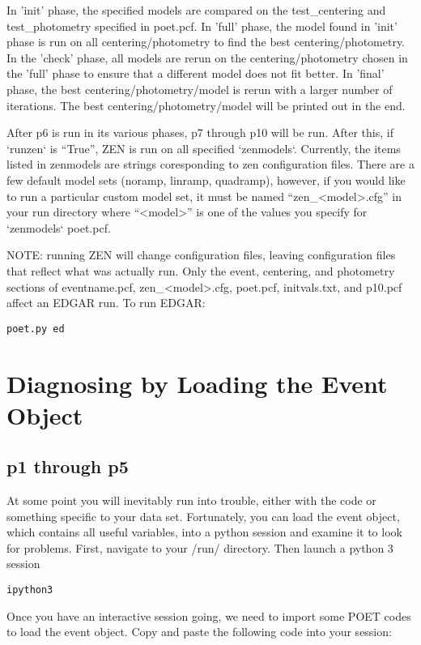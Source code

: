 \documentclass[letterpaper,12pt]{article}
\begin{document}
In 'init' phase, the specified models are compared on the
test\_centering and test\_photometry specified in poet.pcf. In 'full'
phase, the model found in 'init' phase is run on all
centering/photometry to find the best centering/photometry. In the
'check' phase, all models are rerun on the centering/photometry chosen
in the 'full' phase to ensure that a different model does not fit
better. In 'final' phase, the best centering/photometry/model is rerun
with a larger number of iterations. The best
centering/photometry/model will be printed out in the end.

After p6 is run in its various phases, p7 through p10 will be
run. After this, if `runzen` is ``True'', ZEN is run on all specified
`zenmodels`. Currently, the items listed in zenmodels are strings
coresponding to zen configuration files. There are a few default model
sets (noramp, linramp, quadramp), however, if you would like to run a
particular custom model set, it must be named ``zen\_<model>.cfg'' in
your run directory where ``<model>'' is one of the values you specify
for `zenmodels` poet.pcf.

NOTE: running ZEN will change configuration files, leaving
configuration files that reflect what was actually run. Only the
event, centering, and photometry sections of eventname.pcf,
zen\_<model>.cfg, poet.pcf, initvals.txt, and p10.pcf affect an EDGAR
run. To run EDGAR:

\begin{verbatim}
poet.py ed
\end{verbatim}

\section{Diagnosing by Loading the Event Object}
\subsection{p1 through p5}
At some point you will inevitably run into trouble, either with the
code or something specific to your data set. Fortunately, you can load
the event object, which contains all useful variables, into a python
session and examine it to look for problems. First, navigate to your
/run/ directory. Then launch a python 3 session

\begin{verbatim}
ipython3
\end{verbatim}

Once you have an interactive session going, we need to import some POET
codes to load the event object. Copy and paste the following code
into your session:
\end{document}

